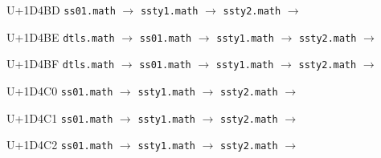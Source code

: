 \documentclass{article}
\begin{document}
\begin{substitutions}
\goodbreak

U+1D4BD  \linebreak
    \texttt{ss01.math} $\to$  \linebreak
    \texttt{ssty1.math} $\to$  \linebreak
    \texttt{ssty2.math} $\to$  

\goodbreak

U+1D4BE  \linebreak
    \texttt{dtls.math} $\to$  \linebreak
    \texttt{ss01.math} $\to$  \linebreak
    \texttt{ssty1.math} $\to$  \linebreak
    \texttt{ssty2.math} $\to$  

\goodbreak

U+1D4BF  \linebreak
    \texttt{dtls.math} $\to$  \linebreak
    \texttt{ss01.math} $\to$  \linebreak
    \texttt{ssty1.math} $\to$  \linebreak
    \texttt{ssty2.math} $\to$  

\goodbreak

U+1D4C0  \linebreak
    \texttt{ss01.math} $\to$  \linebreak
    \texttt{ssty1.math} $\to$  \linebreak
    \texttt{ssty2.math} $\to$  

\goodbreak

U+1D4C1  \linebreak
    \texttt{ss01.math} $\to$  \linebreak
    \texttt{ssty1.math} $\to$  \linebreak
    \texttt{ssty2.math} $\to$  

\goodbreak

U+1D4C2  \linebreak
    \texttt{ss01.math} $\to$  \linebreak
    \texttt{ssty1.math} $\to$  \linebreak
    \texttt{ssty2.math} $\to$  


\end{substitutions}
\end{document}
